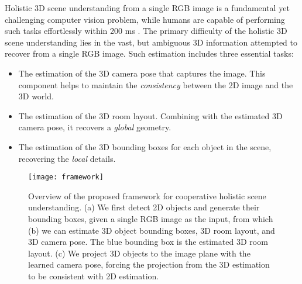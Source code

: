 \documentclass{article}
\begin{document}
Holistic 3D scene understanding from a single RGB image is a fundamental yet challenging computer vision problem, while humans are capable of performing such tasks effortlessly within 200 ms \citep{potter1975meaning,potter1976short,schyns1994blobs,thorpe1996speed}. The primary difficulty of the holistic 3D scene understanding lies in the vast, but ambiguous 3D information attempted to recover from a single RGB image. Such estimation includes three essential tasks:
\begin{itemize}[leftmargin=*,noitemsep,nolistsep]
    \item The estimation of the 3D camera pose that captures the image. This component helps to maintain the \emph{consistency} between the 2D image and the 3D world.
    \item The estimation of the 3D room layout. Combining with the estimated 3D camera pose, it recovers a \emph{global} geometry.
    \item The estimation of the 3D bounding boxes for each object in the scene, recovering the \emph{local} details.
\end{itemize}

\begin{figure}[t!]
    \begin{center}
        \texttt{[image: framework]}
    \end{center}
    \caption{Overview of the proposed framework for cooperative holistic scene understanding. (a) We first detect 2D objects and generate their bounding boxes, given a single RGB image as the input, from which (b) we can estimate 3D object bounding boxes, 3D room layout, and 3D camera pose. The blue bounding box is the estimated 3D room layout. (c) We project 3D objects to the image plane with the learned camera pose, forcing the projection from the 3D estimation to be consistent with 2D estimation.}
    \label{fig:overview}
\end{figure}
\end{document}
